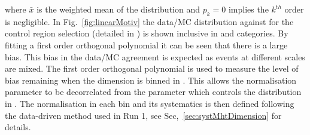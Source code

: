 where $\bar{x}$ is the weighted mean of the distribution and $p_k = 0$ 
implies the $k^{th}$ order is negligible.
In Fig.~\ref{fig:linearMotiv} the data/MC 
distribution against \mht for the control region selection 
(detailed in \cite{CMS_AN_2013-366}) is shown inclusive 
in \scalht and categories. By fitting a first order
orthogonal polynomial it can be seen that there is a large bias. 
This bias in the data/MC agreement is expected as events 
at different scales are mixed.
The first order orthogonal polynomial
is used to measure the level of bias remaining 
when the \mht dimension is binned in \scalht.
This allows the normalisation parameter to be
decorrelated from the parameter which controls
the distribution in \mht.
The normalisation in each \scalht bin and its systematics 
is then defined following the data-driven method used in Run 1, see Sec,~\ref{sec:systMhtDimension} for details.
